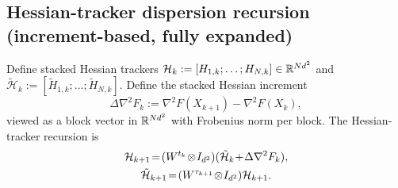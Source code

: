 \documentclass[review,onefignum,onetabnum]{siamart171218}
\begin{document}
\subsection{Hessian-tracker dispersion recursion (increment-based, fully expanded)}

Define stacked Hessian trackers $\mathcal H_k:=[H_{1,k};\dots;H_{N,k}]\in\mathbb{R}^{Nd^2}$ and
$\tilde{\mathcal H}_k:=[\tilde H_{1,k};\dots;\tilde H_{N,k}]$.
Define the stacked Hessian increment
\[
\Delta\nabla^2 F_k:=\nabla^2 F(X_{k+1})-\nabla^2 F(X_k),
\]
viewed as a block vector in $\mathbb{R}^{Nd^2}$ with Frobenius norm per block.
The Hessian-tracker recursion is
\begin{gather}
\mathcal H_{k+1}\!=\!(W^{t_k}\!\otimes\! I_{d^2})(\tilde{\mathcal H}_k\!+\!\Delta\nabla^2 F_k),\label{eq:H_update_stack}\\
\tilde{\mathcal H}_{k+1}\!=\!(W^{\tau_{k+1}}\!\otimes\! I_{d^2})\mathcal H_{k+1}.\notag
\end{gather}
\end{document}
